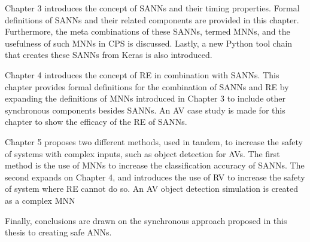 Chapter 3 introduces the concept of \acfp{SANN} and their timing properties.
Formal definitions of \acp{SANN} and their related components are provided in this chapter.
Furthermore, the meta combinations of these \acp{SANN}, termed \acp{MNN}, and the usefulness of such \acp{MNN} in \ac{CPS} is discussed.
Lastly, a new Python tool chain that creates these \acp{SANN} from Keras is also introduced.

Chapter 4 introduces the concept of \acf{RE} in combination with \acp{SANN}. 
This chapter provides formal definitions for the combination of \acp{SANN} and \ac{RE} by expanding the definitions of \acp{MNN} introduced in Chapter 3 to include other synchronous components besides \acp{SANN}.
An \acf{AV} case study is made for this chapter to show the efficacy of the \ac{RE} of \acp{SANN}.

Chapter 5 proposes two different methods, used in tandem, to increase the safety of systems with complex inputs, such as object detection for \acp{AV}.
The first method is the use of \acp{MNN} to increase the classification accuracy of \acp{SANN}.
The second expands on Chapter 4, and introduces the use of \ac{RV} to increase the safety of system where \ac{RE} cannot do so.
An \ac{AV} object detection simulation is created as a complex \ac{MNN} 

Finally, conclusions are drawn on the synchronous approach proposed in this thesis to creating safe \acp{ANN}.

